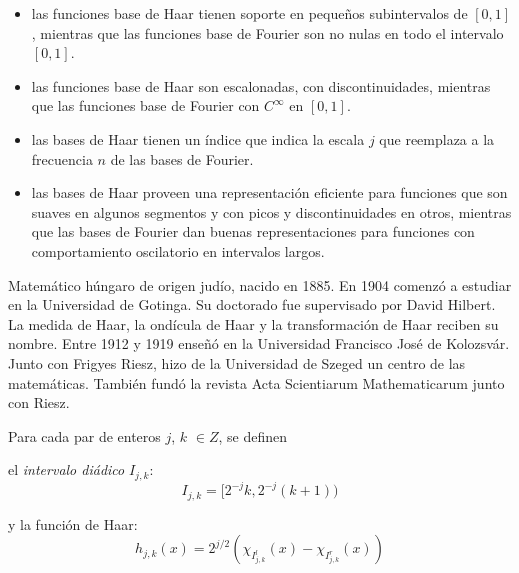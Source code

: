  \begin{itemize}
     \item las funciones base de Haar tienen soporte en pequeños subintervalos de $[0,1]$, mientras que las funciones base de Fourier son no nulas en todo el intervalo $[0,1]$.
     \item las funciones base de Haar son escalonadas, con discontinuidades, mientras que las funciones base de Fourier con $C^{\infty}$ en $[0,1]$.
     \item las bases de Haar   tienen un índice que indica la escala $j$ que reemplaza  a la frecuencia $n$ de las bases de Fourier.  
     
     \item las bases de Haar proveen una representación eficiente para funciones que son suaves en algunos segmentos y con picos y discontinuidades en otros, mientras que las bases de Fourier dan buenas representaciones para funciones con comportamiento oscilatorio en intervalos largos.
     
     
 \end{itemize}


 

 \bigskip

\begin{parchment}{Matemático húngaro de origen judío, nacido en 1885. En 1904 comenzó a estudiar en la Universidad de Gotinga. Su doctorado fue supervisado por David Hilbert. La medida de Haar, la ondícula de Haar y la transformación de Haar reciben su nombre. Entre 1912 y 1919 enseñó en la Universidad Francisco José de Kolozsvár. Junto con Frigyes Riesz, hizo de la Universidad de Szeged un centro de las matemáticas. También fundó la revista Acta Scientiarum Mathematicarum junto con Riesz. \cite{haar} }
\end{parchment}


 \bigskip
 
 Para cada par de enteros $j$, $k$ $\in Z$, se definen 
 
 
 el \textit{intervalo diádico} $I_{j,k}$:
 \begin{equation}
   I_{j,k} = [2^{-j}k,2^{-j}(k+1)) 
   \label{108} 
 \end{equation} 
 
 y la función de Haar:
 \begin{equation}
   h_{j,k}(x) = 2^{j/2}(\chi_{I^{l}_{j,k}} (x) - \chi_{I^{r}_{j,k}} (x)  ) 
   \label{110} 
 \end{equation} 
 
